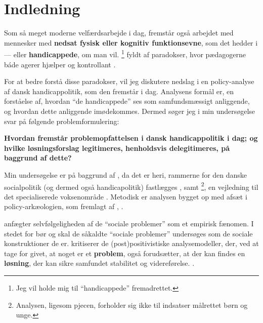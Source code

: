 \section{Indledning}

Som så meget moderne velfærdsarbejde i dag, fremstår også arbejdet med mennesker med \textbf{nedsat fysisk eller kognitiv funktionsevne}, som det hedder i  — eller \textbf{handicappede}, om man vil. \footnote{Jeg vil holde mig til “handicappede” fremadrettet.} fyldt af paradokser, hvor pædagogerne báde agerer hjælper og kontrollant \autocite{mik-meyerIndledningSkabeProfessionel2012}.

For at bedre forstå disse paradokser, vil jeg diskutere nedslag i en policy-analyse af dansk handicappolitik, som den fremstår i dag.
Analysens formål er, en forståelse af, hvordan “de handicappede” ses som samfundsmæssigt anliggende, og hvordan dette anliggende imødekommes.
Dermed søger jeg i min undersøgelse svar på følgende problemformulering:

\begin{blockquote}
  \textbf{Hvordan fremstår problemopfattelsen i dansk handicappolitik i dag; og hvilke løsningsforslag legitimeres, henholdsvis delegitimeres, på baggrund af dette?}
\end{blockquote}

Min undersøgelse er på baggrund af , da det er heri, rammerne for den danske socialpolitik (og dermed også handicapolitik) fastlægges \autocite[kapitel 2]{social-ogindenrigsministerietBekendtgorelseAfLov2019}, samt \footnote{Analysen, ligesom pjecen, forholder sig ikke til indsatser målrettet børn og unge.}, en vejledning til det specialiserede voksenområde \autocite{klStyringAfDet2017}.
Metodisk er analysen bygget op med afsæt i policy-arkæologien, som fremlagt af \citeauthor{scheurichPolicyArchaeologyNew1994}, \citeyear{scheurichPolicyArchaeologyNew1994}.

\citeauthor{scheurichPolicyArchaeologyNew1994} anfægter selvfølgeligheden af de “sociale problemer” som et empirisk fænomen.
I stedet for bør og skal de såkaldte “sociale problemer” undersøges som de sociale konstruktioner de er.
\citeauthor{scheurichPolicyArchaeologyNew1994} kritiserer de (post)positivistiske analysemodeller, der, ved at tage for givet, at noget er et \textbf{problem}, også forudsætter, at der kan findes en \textbf{løsning}, der kan sikre samfundet stabilitet og videreførelse. \autocite[ss. 298-299]{scheurichPolicyArchaeologyNew1994}.


